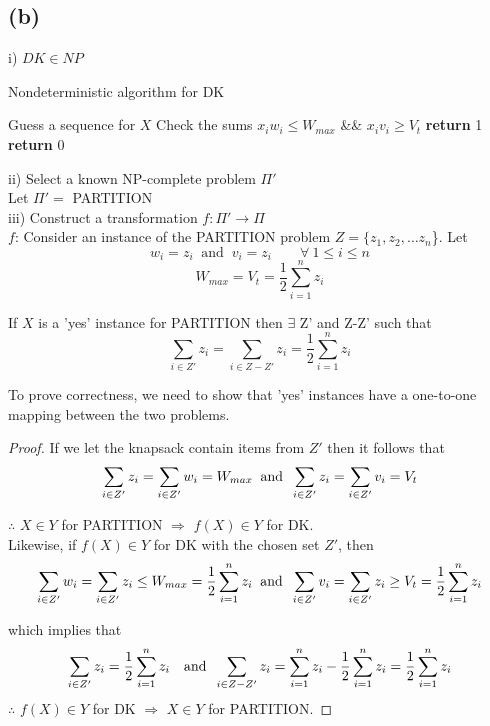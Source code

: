 	\subsection*{(b)}
		 i) $DK \in NP$
			\begin{algorithm}[H]
				\caption{Nondeterministic algorithm for DK}
				\begin{algorithmic}[1]
					\State Guess a sequence for $X$
					\State Check the sums $x_i w_i\leq W_{max}$ \&\& $x_i v_i \geq V_t$ 
					\State \textbf{return} 1
					\Else 
					\State \textbf{return} 0
					\EndIf
				\end{algorithmic}
			\end{algorithm}
		\noindent
		ii) Select a known NP-complete problem $\Pi'$\\
			\indent Let $\Pi' = $ PARTITION\\
		iii) Construct a transformation $f: \Pi' \rightarrow \Pi$\\	
			\indent $f$: Consider an instance of the PARTITION problem $Z = \{z_1, z_2, \dots z_n$\}. Let \[w_i = z_i \: \text{ and }\: v_i = z_i \qquad \forall \: 1 \leq i \leq n\] \[W_{max} = V_t = \frac{1}{2}\sum_{i=1}^{n}z_i\]
			
			If $X$ is a 'yes' instance for PARTITION then $\exists$ Z' and Z-Z' such that 
			\[\sum_{i\in Z'}z_i = \sum_{i\in Z-Z'}z_i = \frac{1}{2}\sum_{i=1}^{n}z_i \]
			
			\noindent
			To prove correctness, we need to show that 'yes' instances have a one-to-one mapping between the two problems.
			\begin{proof}
				If we let the knapsack contain items from $Z'$ then it follows that 
				\[ \sum_{i\in Z'}z_i = \sum_{i\in Z'}w_i = W_{max} \text{\: and \:}\sum_{i\in Z'}z_i = \sum_{i\in Z'}v_i = V_t\]
				
				$\therefore$ $X \in Y$ for PARTITION $\Rightarrow$ $f(X) \in Y$ for DK.\\
				
				Likewise, if $f(X)\in Y$ for DK with the chosen set $Z'$, then
				\[\sum_{i\in Z'}w_i = \sum_{i\in Z'}z_i \leq W_{max} = \frac{1}{2}\sum_{i=1}^{n}z_i \text{\: and \:} \sum_{i\in Z'}v_i = \sum_{i\in Z'}z_i \geq V_t = \frac{1}{2}\sum_{i=1}^{n}z_i\]
				
				which implies that
				\[\sum_{i\in Z'}z_i = \frac{1}{2}\sum_{i=1}^{n}z_i \text{\quad and \:} \sum_{i\in Z-Z'}z_i = \sum_{i=1}^{n}z_i - \frac{1}{2}\sum_{i=1}^{n}z_i = \frac{1}{2}\sum_{i=1}^{n}z_i\]
			\indent $\therefore$ $f(X) \in Y$ for DK $\Rightarrow$ $X \in Y$ for PARTITION.
			\end{proof}
			

